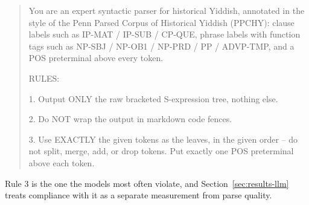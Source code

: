 \documentclass[11pt]{article}
\begin{document}
\begin{quote}\small\ttfamily
You are an expert syntactic parser for historical Yiddish, annotated in the style
of the Penn Parsed Corpus of Historical Yiddish (PPCHY): clause labels such as
IP-MAT / IP-SUB / CP-QUE, phrase labels with function tags such as NP-SBJ /
NP-OB1 / NP-PRD / PP / ADVP-TMP, and a POS preterminal above every token.

RULES:

1. Output ONLY the raw bracketed S-expression tree, nothing else.

2. Do NOT wrap the output in markdown code fences.

3. Use EXACTLY the given tokens as the leaves, in the given order -- do not split,
merge, add, or drop tokens. Put exactly one POS preterminal above each token.
\end{quote}

Rule 3 is the one the models most often violate, and
Section~\ref{sec:results-llm} treats compliance with it as a separate measurement
from parse quality.
\end{document}
